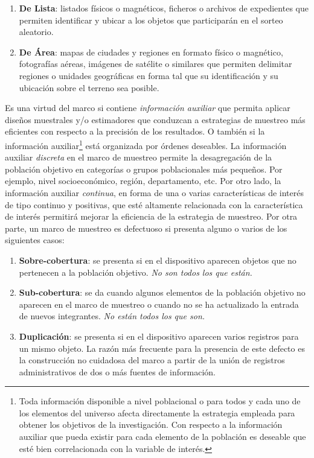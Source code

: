 \documentclass[
  10pt,
  spanish,
]{book}
\providecommand{\tightlist}{%
  \setlength{\itemsep}{0pt}\setlength{\parskip}{0pt}}
\begin{document}
\begin{enumerate}
\def\labelenumi{\arabic{enumi}.}
\tightlist
\item
  \textbf{De Lista}: listados físicos o magnéticos, ficheros o archivos de expedientes que permiten identificar y ubicar a los objetos que participarán en el sorteo aleatorio.
\item
  \textbf{De Área}: mapas de ciudades y regiones en formato físico o magnético, fotografías aéreas, imágenes de satélite o similares que permiten delimitar regiones o unidades geográficas en forma tal que su identificación y su ubicación sobre el terreno sea posible.
\end{enumerate}

Es una virtud del marco si contiene \emph{información auxiliar} que permita aplicar diseños muestrales y/o estimadores que conduzcan a estrategias de muestreo más eficientes con respecto a la precisión de los resultados. O también si la información auxiliar\footnote{Toda información disponible a nivel poblacional o para todos y cada uno de los elementos del universo afecta directamente la estrategia empleada para obtener los objetivos de la investigación. Con respecto a la información auxiliar que pueda existir para cada elemento de la población es deseable que esté bien correlacionada con la variable de interés.} está organizada por órdenes deseables. La información auxiliar \emph{discreta} en el marco de muestreo permite la desagregación de la población objetivo en categorías o grupos poblacionales más pequeños. Por ejemplo, nivel socioeconómico, región, departamento, etc. Por otro lado, la información auxiliar \emph{continua}, en forma de una o varias características de interés de tipo continuo y positivas, que esté altamente relacionada con la característica de interés permitirá mejorar la eficiencia de la estrategia de muestreo. Por otra parte, un marco de muestreo es defectuoso si presenta alguno o varios de los siguientes casos:

\begin{enumerate}
\def\labelenumi{\arabic{enumi}.}
\tightlist
\item
  \textbf{Sobre-cobertura}: se presenta si en el dispositivo aparecen objetos que no pertenecen a la población objetivo. \emph{No son todos los que están.}
\item
  \textbf{Sub-cobertura}: se da cuando algunos elementos de la población objetivo no aparecen en el marco de muestreo o cuando no se ha actualizado la entrada de nuevos integrantes. \emph{No están todos los que son.}
\item
  \textbf{Duplicación}: se presenta si en el dispositivo aparecen varios registros para un mismo objeto. La razón más frecuente para la presencia de este defecto es la construcción no cuidadosa del marco a partir de la unión de registros administrativos de dos o más fuentes de información.
\end{enumerate}
\end{document}
